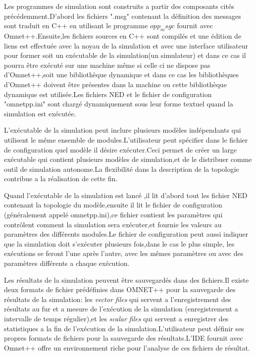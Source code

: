 Les programmes de simulation sont construits a partir des composants cités précédemment.D'abord les fichiers ".msg" contenant la définition des messages sont traduit
en C++ en utilisant le programme $opp_msgc$ fournit avec Omnet++.Ensuite,les fichiers 
sources en C++ sont compilés et une édition de liens est effectuée avec la noyau de la simulation et avec une interface utilisateur pour former soit un exécutable de la simulation(un simulateur) et dans ce cas il pourra être exécuté sur une machine même si celle ci ne dispose pas d'Omnet++,soit une bibliothèque dynamique et dans ce cas les bibliothèques d'Omnet++ doivent être présentes dans la machine ou cette bibliothèque dynamique est utilisée.Les fichiers NED et le fichier de configuration "omnetpp.ini" sont chargé dynamiquement sous leur forme textuel quand la simulation est exécutée.

L'exécutable de la simulation peut inclure plusieurs modèles indépendants qui utilisent le même ensemble de modules.L'utilisateur peut spécifier dans le fichier de configuration quel modèle il désire exécuter.Ceci permet de créer un large exécutable qui contient plusieurs modèles de simulation,et de le distribuer comme outil de simulation autonome.La flexibilité dans la description de la topologie contribue a la réalisation de cette fin. 

Quand l'exécutable de la simulation est lancé ,il lit d'abord tout les fichier NED contenant la topologie du modèle,ensuite il lit le fichier de configuration (généralement appelé omnetpp.ini),ce fichier contient les paramètres qui contrôlent comment la simulation sera exécuter,et fournie les valeurs au paramètres des différents modules.Le fichier de configuration peut aussi indiquer que la simulation doit s'exécuter plusieurs fois,dans le cas le plus simple, les exécutions se feront l'une après l'autre, avec les mêmes paramètres  ou avec des paramètres différents a chaque exécution.

Les résultats de la simulation peuvent être sauvegardés dans des fichiers.Il existe deux formats de fichier prédéfinies dans OMNET++ pour la sauvegarde des résultats de la simulation: les \emph{vector files} qui servent a l'enregistrement des résultats au fur et a mesure de l'exécution de la simulation (enregistrement a intervalle de temps régulier),et les \emph{scalar files} qui servent a enregistrer des statistiques a la fin de l'exécution de la simulation.L'utilisateur peut définir ses propres formats de fichiers pour la sauvegarde des résultats.L'IDE fournit avec Omnet++ offre un environnement riche pour l'analyse de ces fichiers de résultat.

